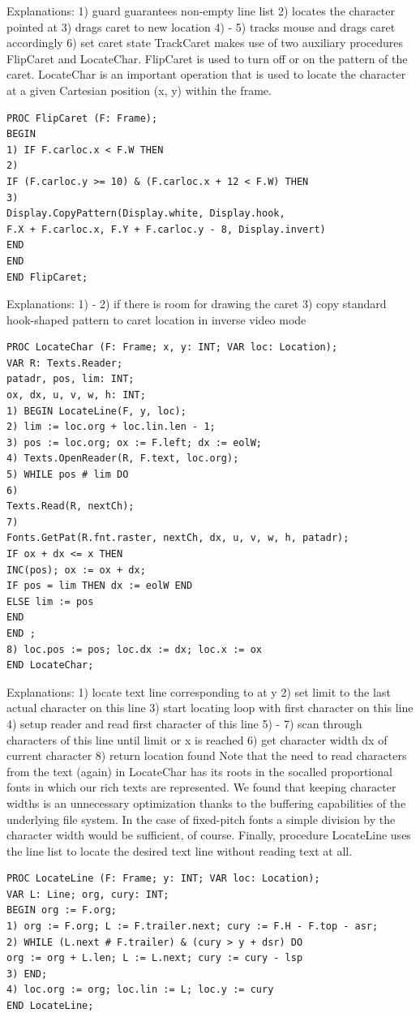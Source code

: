 Explanations:
1) guard guarantees non-empty line list
2) locates the character pointed at
3) drags caret to new location
4) - 5) tracks mouse and drags caret accordingly
6) set caret state
TrackCaret makes use of two auxiliary procedures FlipCaret and LocateChar. FlipCaret is used to
turn off or on the pattern of the caret. LocateChar is an important operation that is used to locate
the character at a given Cartesian position (x, y) within the frame.
\begin{verbatim}
PROC FlipCaret (F: Frame);
BEGIN
1) IF F.carloc.x < F.W THEN
2)
IF (F.carloc.y >= 10) & (F.carloc.x + 12 < F.W) THEN
3)
Display.CopyPattern(Display.white, Display.hook,
F.X + F.carloc.x, F.Y + F.carloc.y - 8, Display.invert)
END
END
END FlipCaret;
\end{verbatim}

Explanations:
1) - 2) if there is room for drawing the caret
3) copy standard hook-shaped pattern to caret location in inverse video mode
\begin{verbatim}
PROC LocateChar (F: Frame; x, y: INT; VAR loc: Location);
VAR R: Texts.Reader;
patadr, pos, lim: INT;
ox, dx, u, v, w, h: INT;
1) BEGIN LocateLine(F, y, loc);
2) lim := loc.org + loc.lin.len - 1;
3) pos := loc.org; ox := F.left; dx := eolW;
4) Texts.OpenReader(R, F.text, loc.org);
5) WHILE pos # lim DO
6)
Texts.Read(R, nextCh);
7)
Fonts.GetPat(R.fnt.raster, nextCh, dx, u, v, w, h, patadr);
IF ox + dx <= x THEN
INC(pos); ox := ox + dx;
IF pos = lim THEN dx := eolW END
ELSE lim := pos
END
END ;
8) loc.pos := pos; loc.dx := dx; loc.x := ox
END LocateChar;
\end{verbatim}
Explanations:
1) locate text line corresponding to at y
2) set limit to the last actual character on this line
3) start locating loop with first character on this line
4) setup reader and read first character of this line
5) - 7) scan through characters of this line until limit or x is reached
6) get character width dx of current character
8) return location found
Note that the need to read characters from the text (again) in LocateChar has its roots in the socalled proportional fonts in which our rich texts are represented. We found that keeping character
widths is an unnecessary optimization thanks to the buffering capabilities of the underlying file
system. In the case of fixed-pitch fonts a simple division by the character width would be sufficient,
of course.
Finally, procedure LocateLine uses the line list to locate the desired text line without reading text at
all.
\begin{verbatim}
PROC LocateLine (F: Frame; y: INT; VAR loc: Location);
VAR L: Line; org, cury: INT;
BEGIN org := F.org;
1) org := F.org; L := F.trailer.next; cury := F.H - F.top - asr;
2) WHILE (L.next # F.trailer) & (cury > y + dsr) DO
org := org + L.len; L := L.next; cury := cury - lsp
3) END;
4) loc.org := org; loc.lin := L; loc.y := cury
END LocateLine;
\end{verbatim}

